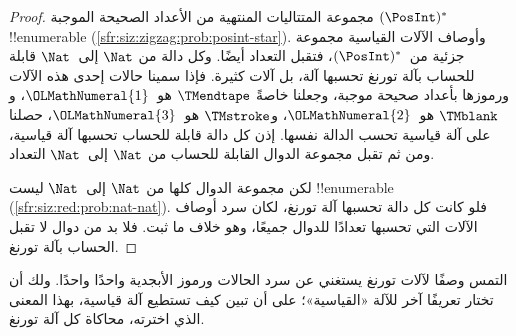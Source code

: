 \documentclass[../../../include/open-logic-section]{subfiles}
\begin{document}
\begin{proof}
مجموعة المتتاليات المنتهية من الأعداد الصحيحة الموجبة
$(\PosInt)^*$ !!{enumerable}
(\cref{sfr:siz:zigzag:prob:posint-star}). وأوصاف الآلات القياسية
مجموعة جزئية من~$(\PosInt)^*$، فتقبل التعداد أيضًا. وكل دالة من
$\Nat$ إلى~$\Nat$ قابلة للحساب بآلة تورنغ تحسبها آلة، بل آلات كثيرة.
فإذا سمينا حالات إحدى هذه الآلات ورموزها بأعداد صحيحة موجبة، وجعلنا
خاصةً $\TMendtape$ هو~$\OLMathNumeral{1}$، و$\TMblank$ هو~$\OLMathNumeral{2}$،
و$\TMstroke$ هو~$\OLMathNumeral{3}$، حصلنا على آلة قياسية تحسب الدالة نفسها.
إذن كل دالة قابلة للحساب تحسبها آلة قياسية، ومن ثم تقبل مجموعة
الدوال القابلة للحساب من $\Nat$ إلى~$\Nat$ التعداد.

لكن مجموعة الدوال كلها من $\Nat$ إلى~$\Nat$ ليست !!{enumerable}
(\cref{sfr:siz:red:prob:nat-nat}). فلو كانت كل دالة تحسبها آلة
تورنغ، لكان سرد أوصاف الآلات التي تحسبها تعدادًا للدوال جميعًا، وهو
خلاف ما ثبت. فلا بد من دوال لا تقبل الحساب بآلة تورنغ.
\end{proof}

\begin{prob}
  التمس وصفًا لآلات تورنغ يستغني عن سرد الحالات ورموز الأبجدية واحدًا
  واحدًا. ولك أن تختار تعريفًا آخر للآلة «القياسية»؛ على أن تبين
  كيف تستطيع آلة قياسية، بهذا المعنى الذي اخترته، محاكاة كل آلة تورنغ.
\end{prob}
\end{document}
